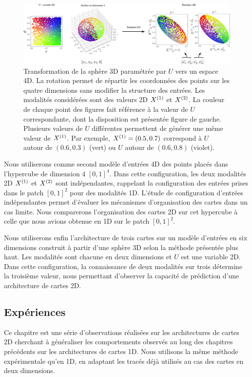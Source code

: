 \documentclass[../main]{subfiles}
\begin{document}
\begin{figure}
	\includegraphics[width=\textwidth]{sphere_inputs_colormap.png}
	\caption{Transformation de la sphère 3D paramétrée par $U$ vers un espace 4D. La rotation permet de répartir les coordonnées des points sur les quatre dimensions sans modifier la structure des entrées. Les modalités considérées sont des valeurs 2D $X^{({1})}$ et $X^{({2})}$.
	La couleur de chaque point des figures fait référence à la valeur de $U$ correspondante, dont la disposition est présentée figure de gauche. Plusieurs valeurs de $U$ différentes permettent de générer une même valeur de $X^{({1})}$. Par exemple, $X^{({1})} = (0.5, 0.7)$ correspond à $U$ autour de $(0.6,0.3)$ (vert) ou $U$ autour de $ (0.6,0.8)$ (violet).
	\label{fig:sphere_inputs}}
\end{figure}

Nous utiliserons comme second modèle d'entrées 4D des points placés dans l'hypercube de dimension 4 $[0,1]^4$. Dans cette configuration, les deux modalités 2D $X^{({1})}$ et $X^{({2})}$ sont indépendantes, rappelant la configuration des entrées prises dans le patch $[0,1]^2$ pour des modalités 1D. L'étude de configuration d'entrées indépendantes permet d'évaluer les mécanismes d'organisation des cartes dans un cas limite.
Nous comparerons l'organisation des cartes 2D sur cet hypercube à celle que nous avions obtenue en 1D sur le patch $[0,1]^2$. 


Nous utiliserons enfin l'architecture de trois cartes sur un modèle d'entrées en six dimensions construit à partir d'une sphère 3D selon la méthode présentée plus haut. 
Les modalités sont chacune en deux dimensions et $U$ est une variable 2D.
Dans cette configuration, la connaissance de deux modalités sur trois détermine la troisième valeur, nous permettant d'observer la capacité de prédiction d'une architecture de cartes 2D.

\subsection{Expériences}

Ce chapitre est une série d'observations réalisées sur les architectures de cartes 2D cherchant à généraliser les comportements observés au long des chapitres précédents sur les architectures de cartes 1D.
Nous utilisons la même méthode expérimentale qu'en 1D, en adaptant les tracés déjà utilisés au cas des cartes en deux dimensions.
\end{document}
